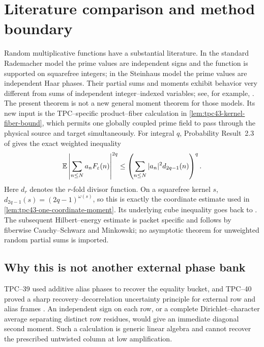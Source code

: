 \section{Literature comparison and method boundary}
\label{sec:tpc43-literature}

Random multiplicative functions have a substantial literature.  In the
standard Rademacher model the prime values are independent signs and the
function is supported on squarefree integers; in the Steinhaus model the
prime values are independent Haar phases.  Their partial sums and moments
exhibit behavior very different from sums of independent integer--indexed
variables; see, for example,
\citet{HeapLindqvist2016,Harper2019HighMoments,Harper2020LowMoments}.
The present theorem is not a new general moment theorem for those models.
Its new input is the TPC--specific product--fiber calculation in
\cref{lem:tpc43-kernel-fiber-bound}, which permits one globally coupled
prime field to pass through the physical source and target simultaneously.
For integral \(q\), Probability Result~2.3 of
\citet{Harper2019HighMoments} gives the exact weighted inequality
\begin{equation}
 \mathbb E\left|\sum_{n\le N}a_nF_\varepsilon(n)\right|^{2q}
 \le\left(
  \sum_{n\le N}|a_n|^2d_{2q-1}(n)
 \right)^q.
 \label{eq:tpc43-Harper-weighted-moment}
\end{equation}
Here \(d_r\) denotes the \(r\)-fold divisor function.
On a squarefree kernel \(s\),
\(d_{2q-1}(s)=(2q-1)^{\omega(s)}\), so this is exactly the
coordinate estimate used in
\cref{lem:tpc43-one-coordinate-moment}.  Its underlying cube inequality
goes back to \citet{Bonami1970,Beckner1975}.  The subsequent
Hilbert--energy estimate is packet specific and follows by fiberwise
Cauchy--Schwarz and Minkowski; no asymptotic theorem for unweighted random
partial sums is imported.

\subsection{Why this is not another external phase bank}

TPC--39 used additive alias phases to recover the equality bucket, and
TPC--40 proved a sharp recovery--decorrelation uncertainty principle for
external row and alias frames \citep{WangTPC40}.  An independent sign on
each row, or a complete Dirichlet--character average separating distinct
row residues, would give an immediate diagonal second moment.  Such a
calculation is generic linear algebra and cannot recover the prescribed
untwisted column at low amplification.

